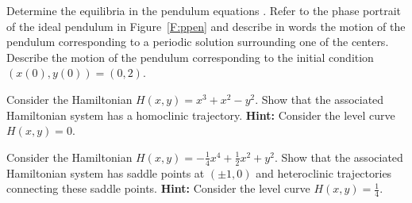 \documentclass{ximera}
\begin{document}
\begin{exercise} \label{c14.7.9}
Determine the equilibria in the pendulum equations .
Refer to the phase portrait of the ideal pendulum in Figure~\ref{F:ppen}
and describe in words the motion of the pendulum corresponding to a periodic 
solution surrounding one of the centers.  Describe the motion of the 
pendulum corresponding to the initial condition $(x(0),y(0))=(0,2)$.
\end{exercise}

\begin{exercise} \label{c14.7.10}
Consider the Hamiltonian  $H(x,y) = x^3 + x^2 - y^2$.  Show that the 
associated Hamiltonian system has a homoclinic trajectory.  {\bf Hint:} 
Consider the level curve $H(x,y)=0$.
\end{exercise}

\begin{exercise} \label{c14.7.11} 
Consider the Hamiltonian  $H(x,y) = -\frac{1}{4}x^4 + \frac{1}{2}x^2 + y^2$.  
Show that the associated Hamiltonian system has saddle points at $(\pm 1,0)$ 
and heteroclinic trajectories connecting these saddle points.  {\bf Hint:} 
Consider the level curve $H(x,y) = \frac{1}{4}$.
\end{exercise}






 
\end{document}
